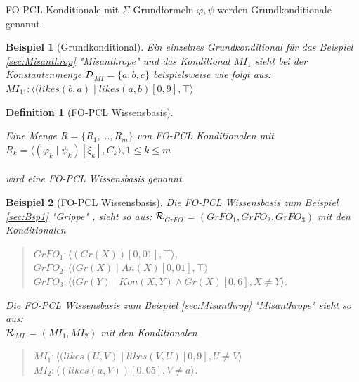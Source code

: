 \documentclass[a4paper, 11pt]{book}
\newtheorem{Def}{Definition }[section]
\newtheorem{Bsp}{Beispiel}[section]
\begin{document}
FO-PCL-Konditionale mit $ \Sigma $-Grundformeln $ \varphi, \psi $ werden Grundkonditionale genannt. \label{Grundkonditional}

\begin{Bsp}[Grundkonditional]
	Ein einzelnes Grundkonditional für das Beispiel \ref{sec:Misanthrop} "{}Misanthrope"{} und das Konditional $ MI_1 $ sieht bei der Konstantenmenge $ \cal{D} $$_{MI} = \{ a, b, c\} $ beispielsweise wie folgt aus:\\
	$ MI_{11} : \langle (likes(b, a) \mid likes(a, b
	)[0,9], \top \rangle $\\
	
\end{Bsp}

\begin{Def}[FO-PCL Wissensbasis]\cite[S. 6]{Fis12}  \label{KB}

\noindent
Eine Menge $ R = \{R_1, ..., R_m\} $ von FO-PCL Konditionalen mit\\

 $ R_k =  \langle(\varphi_k \mid \psi_k)[\xi_k], C_k \rangle , 1 \leq k \leq m $ \\
\\wird eine FO-PCL Wissensbasis genannt.
\end{Def}

\begin{Bsp}[FO-PCL Wissensbasis]
Die FO-PCL Wissensbasis zum Beispiel\\ \ref{sec:Bsp1} "{}Grippe"{} ,
sieht so aus: $ \cal{R} $$_{GrFO}  $ = $ (GrFO_1, GrFO_2, GrFO_3)  $ mit den Konditionalen 
\begin{quote}
$ GrFO_{1}  :  \langle (Gr(X))[0,01], \top \rangle $,\\
$ GrFO_{2} : \langle (Gr(X) \mid An(X)[0,01], \top \rangle$\\
$ GrFO_{3} : \langle (Gr(Y) \mid Kon(X, Y) \wedge Gr(X )[0,6], X \neq Y \rangle$.\\
\end{quote}
Die FO-PCL Wissensbasis zum Beispiel \ref{sec:Misanthrop} "{}Misanthrope"{} sieht so aus:\\
 $ \cal{R} $$_{MI}  $ = $ (MI_1, MI_2)  $  mit den Konditionalen 
\begin{quote}
	$ MI_1 : \langle (likes(U, V) \mid likes(V, U)[0,9], U \neq V \rangle$\\
	$ MI_2 : \langle (likes(a, V))[0,05], V \neq a \rangle$.\\
\end{quote}
 	
\end{Bsp}
\end{document}

